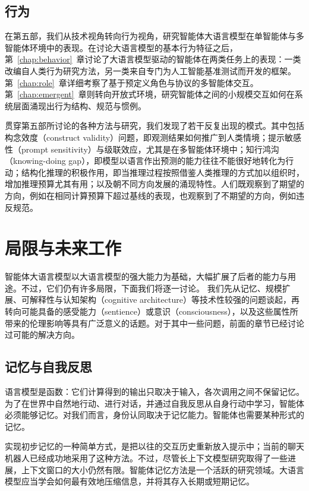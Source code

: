 \subsection{行为}
在第五部，我们从技术视角转向行为视角，研究智能体大语言模型在单智能体与多智能体环境中的表现。在讨论大语言模型的基本行为特征之后，第~\ref{chap:behavior}~章讨论了大语言模型驱动的智能体在两类任务上的表现：一类改编自人类行为研究方法，另一类来自专门为人工智能基准测试而开发的框架。第~\ref{chap:role}~章详细考察了基于预定义角色与协议的多智能体交互。第~\ref{chap:emergent}~章则转向开放式环境，研究智能体之间的小规模交互如何在系统层面涌现出行为结构、规范与惯例。

贯穿第五部所讨论的各种方法与研究，我们发现了若干反复出现的模式。其中包括构念效度（construct validity）问题，即观测结果如何推广到人类情境；提示敏感性（prompt sensitivity）与级联效应，尤其是在多智能体环境中；知行鸿沟（knowing-doing gap），即模型以语言作出预测的能力往往不能很好地转化为行动；结构化推理的积极作用，即当推理过程按照借鉴人类推理的方式加以组织时，增加推理预算尤其有用；以及朝不同方向发展的涌现特性。人们既观察到了期望的方向，例如在相同计算预算下超过基线的表现，也观察到了不期望的方向，例如违反规范。

\section{局限与未来工作}\label{sec:limitations}
智能体大语言模型以大语言模型的强大能力为基础，大幅扩展了后者的能力与用途。不过，它们仍有许多局限，下面我们将逐一讨论。
我们先从记忆、规模扩展、可解释性与认知架构（cognitive architecture）等技术性较强的问题谈起，再转向可能具备的感受能力（sentience）或意识（consciousness），以及这些属性所带来的伦理影响等具有广泛意义的话题。对于其中一些问题，前面的章节已经讨论过可能的解决方向。

\subsection{记忆与自我反思}
语言模型是函数：它们计算得到的输出只取决于输入，各次调用之间不保留记忆。为了在世界中自然地行动、进行对话，并通过自我反思从自身行动中学习，智能体必须能够记忆。对我们而言，身份认同取决于记忆能力。智能体也需要某种形式的记忆。

实现初步记忆的一种简单方式，是把以往的交互历史重新放入提示中；当前的聊天机器人已经成功地采用了这种方法。不过，尽管长上下文模型研究取得了一些进展，上下文窗口的大小仍然有限。智能体记忆方法是一个活跃的研究领域。大语言模型应当学会如何最有效地压缩信息，并将其存入长期或短期记忆。

